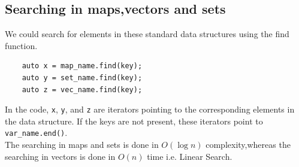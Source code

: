 \documentclass[12pt]{article}
\begin{document}
\subsection{Searching in maps,vectors and sets}
We could search for elements in these standard data structures using the find function.\\
\begin{verbatim}
    auto x = map_name.find(key);
    auto y = set_name.find(key);
    auto z = vec_name.find(key);
\end{verbatim}
In the code, \texttt{x}, \texttt{y}, and \texttt{z} are iterators pointing to the corresponding elements in the data structure. If the keys are not present, these iterators point to \texttt{var\_name.end()}.
\\
The searching in maps and sets is done in $O(\log n)$ complexity,whereas the searching in vectors is done in $O(n)$ time i.e. Linear Search.
\end{document}
